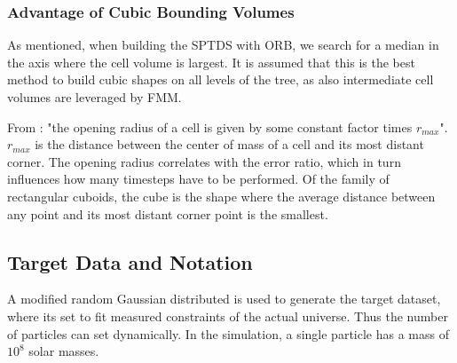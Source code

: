 \documentclass[]{article}
\begin{document}

\subsubsection{Advantage of Cubic Bounding Volumes}

As mentioned, when building the SPTDS with ORB, we search for a median in the axis where the cell volume is largest. It is assumed that this is the best method to build cubic shapes on all levels of the tree, as also intermediate cell volumes are leveraged by FMM. 

From \cite{Stadel2001}: "the opening radius of a cell is given by some constant factor times $r_{max}$". $r_{max}$ is the distance between the center of mass of a cell and its most distant corner. The opening radius correlates with the error ratio, which in turn influences how many timesteps have to be performed. Of the family of rectangular cuboids, the cube is the shape where the average distance between any point and its most distant corner point is the smallest. 


\subsection{Target Data and Notation}\label{sec:target-data}

\begin{comment}
The target data consists of $N$ particles where we use the following notations:

constrained realization
Gaussian random distribution, modified to match the measured power.

The higher the resolution the more accurate the result.

Large scales are more uniform, small scale 

smallest thing you want to be able to resolve. 

boxes around a giga parsec

want to be able to resolve galaxies, milky way 10^12 solar masses,

want to be able to resolve smaller galaxies, 10^8 for a single particle
Imp 
\end{comment}
A modified random Gaussian distributed is used to generate the target dataset, where its set to fit measured constraints of the actual universe. Thus the number of particles can set dynamically. In the simulation, a single particle has a mass of $10^8$ solar masses. 
\end{document}
